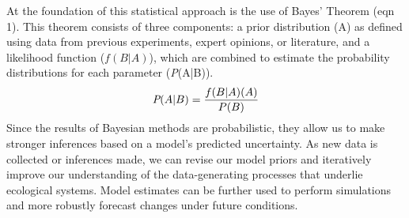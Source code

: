 \documentclass{article}
\begin{document}
At the foundation of this statistical approach is the use of Bayes' Theorem (eqn 1). This theorem consists of three components: a prior distribution (A) %
as defined using data from previous experiments, expert opinions, or literature, and a likelihood function ($f(B|A)$), which are combined to estimate the probability distributions for each parameter (\emph{P}(A|B)). \\
\begin{align}
 \emph{P}(A|B) = \frac{f(B|A)(A)}{P(B)}
 \end{align}
Since the results of Bayesian methods are probabilistic, they allow us to make stronger inferences based on a model's predicted uncertainty. As new data is collected or inferences made, we can revise our model priors and iteratively improve our understanding of the data-generating processes that underlie ecological systems. Model estimates can be further used to perform simulations and more robustly forecast changes under future conditions. 
\end{document}
